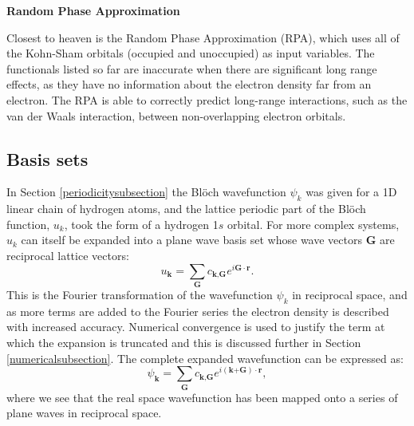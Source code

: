 \textbf{Random Phase Approximation} 

Closest to heaven is the Random Phase Approximation (RPA), which uses all of the Kohn-Sham orbitals (occupied and unoccupied) as input variables. The functionals listed so far are inaccurate when there are significant long range effects, as they have no information about the electron density far from an electron. The RPA is able to correctly predict long-range interactions, such as the van der Waals interaction, between non-overlapping electron orbitals.

\subsection{Basis sets} \label{basissetsection}

In Section \ref{periodicitysubsection} the Bl\"{o}ch wavefunction $\psi_k$ was given for a 1D linear chain of hydrogen atoms, and the lattice periodic part of the Bl\"{o}ch function, $u_k$, took the form of a hydrogen 1$s$ orbital. For more complex systems, $u_k$ can itself be expanded into a plane wave basis set whose wave vectors $\textbf{G}$ are reciprocal lattice vectors:
\begin{equation}
u_\textbf{k} = \sum_\textbf{G}c_{\textbf{k},\textbf{G}}e^{i\textbf{G}\cdot\textbf{r}}.
\end{equation}
This is the Fourier transformation of the wavefunction $\psi_k$ in reciprocal space, and 
as more terms are added to the Fourier series the electron density is described with increased accuracy.
Numerical convergence is used to justify the term at which the expansion is truncated and this is discussed further in Section \ref{numericalsubsection}.
The complete expanded wavefunction can be expressed as:
\begin{equation} \label{KSeigenstates}
\psi_\textbf{k} = \sum_\textbf{G}c_{\textbf{k},\textbf{G}}e^{i(\textbf{k+G})\cdot\textbf{r}},
\end{equation}
where we see that the real space wavefunction has been mapped onto a series of plane waves in reciprocal space.

